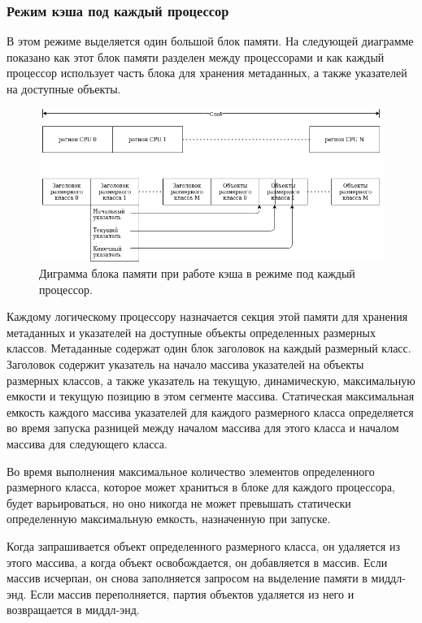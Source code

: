 \subsubsection{Режим кэша под каждый процессор}

В этом режиме выделяется один большой блок памяти. На следующей диаграмме показано как этот блок памяти разделен между процессорами и как каждый процессор использует часть блока для хранения метаданных, а также указателей на доступные объекты.

\begin{figure}[!h]
	\begin{center}
		\includegraphics[scale=0.6]{images/tcmalloc-per-cpu.png}
		\caption{Диграмма блока памяти при работе кэша в режиме под каждый процессор.}
		\label{tcmalloc-per-cpu}
	\end{center}
\end{figure}

Каждому логическому процессору назначается секция этой памяти для хранения метаданных и указателей на доступные объекты определенных размерных классов. Метаданные содержат один блок заголовок на каждый размерный класс. Заголовок содержит указатель на начало массива указателей на объекты размерных классов, а также указатель на текущую, динамическую, максимальную емкости и текущую позицию в этом сегменте массива. Статическая максимальная емкость каждого массива указателей для каждого размерного класса определяется во время запуска разницей между началом массива для этого класса и началом массива для следующего класса.

Во время выполнения максимальное количество элементов определенного размерного класса, которое может храниться в блоке для каждого процессора, будет варьироваться, но оно никогда не может превышать статически определенную максимальную емкость, назначенную при запуске.

Когда запрашивается объект определенного размерного класса, он удаляется из этого массива, а когда объект освобождается, он добавляется в массив. Если массив исчерпан, он снова заполняется запросом на выделение памяти в миддл-энд. Если массив переполняется, партия объектов удаляется из него и возвращается в миддл-энд.

